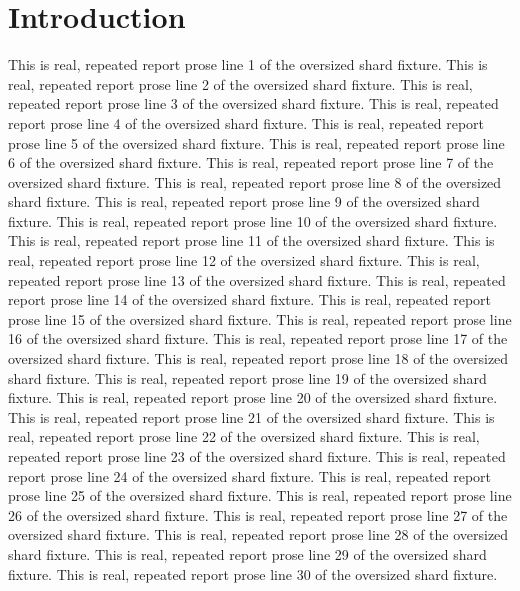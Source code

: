 \section{Introduction}
This is real, repeated report prose line 1 of the oversized shard fixture.
This is real, repeated report prose line 2 of the oversized shard fixture.
This is real, repeated report prose line 3 of the oversized shard fixture.
This is real, repeated report prose line 4 of the oversized shard fixture.
This is real, repeated report prose line 5 of the oversized shard fixture.
This is real, repeated report prose line 6 of the oversized shard fixture.
This is real, repeated report prose line 7 of the oversized shard fixture.
This is real, repeated report prose line 8 of the oversized shard fixture.
This is real, repeated report prose line 9 of the oversized shard fixture.
This is real, repeated report prose line 10 of the oversized shard fixture.
This is real, repeated report prose line 11 of the oversized shard fixture.
This is real, repeated report prose line 12 of the oversized shard fixture.
This is real, repeated report prose line 13 of the oversized shard fixture.
This is real, repeated report prose line 14 of the oversized shard fixture.
This is real, repeated report prose line 15 of the oversized shard fixture.
This is real, repeated report prose line 16 of the oversized shard fixture.
This is real, repeated report prose line 17 of the oversized shard fixture.
This is real, repeated report prose line 18 of the oversized shard fixture.
This is real, repeated report prose line 19 of the oversized shard fixture.
This is real, repeated report prose line 20 of the oversized shard fixture.
This is real, repeated report prose line 21 of the oversized shard fixture.
This is real, repeated report prose line 22 of the oversized shard fixture.
This is real, repeated report prose line 23 of the oversized shard fixture.
This is real, repeated report prose line 24 of the oversized shard fixture.
This is real, repeated report prose line 25 of the oversized shard fixture.
This is real, repeated report prose line 26 of the oversized shard fixture.
This is real, repeated report prose line 27 of the oversized shard fixture.
This is real, repeated report prose line 28 of the oversized shard fixture.
This is real, repeated report prose line 29 of the oversized shard fixture.
This is real, repeated report prose line 30 of the oversized shard fixture.
